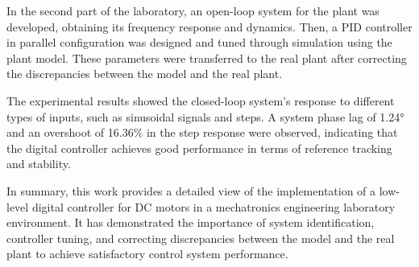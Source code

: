 \documentclass[conference,onecolumn]{IEEEtran}
\begin{document}
In the second part of the laboratory, an open-loop system for the plant was developed, obtaining its frequency response and dynamics. Then, a PID controller in parallel configuration was designed and tuned through simulation using the plant model. These parameters were transferred to the real plant after correcting the discrepancies between the model and the real plant.

The experimental results showed the closed-loop system's response to different types of inputs, such as sinusoidal signals and steps. A system phase lag of 1.24° and an overshoot of 16.36\% in the step response were observed, indicating that the digital controller achieves good performance in terms of reference tracking and stability.

In summary, this work provides a detailed view of the implementation of a low-level digital controller for DC motors in a mechatronics engineering laboratory environment. It has demonstrated the importance of system identification, controller tuning, and correcting discrepancies between the model and the real plant to achieve satisfactory control system performance.

%  
%
\end{document}
